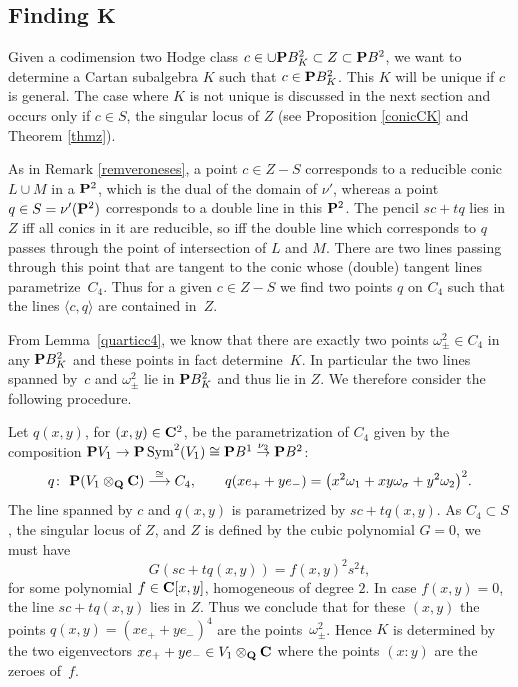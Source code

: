 \documentclass[pdftex]{sigma}
\numberwithin{equation}{section}
\begin{document}
\subsection[Finding K]{Finding $\boldsymbol{K}$} \label{findB2p}

Given a codimension two Hodge class $c\in \cup {\bf P} B^2_K\subset Z\subset {\bf P} B^2$,
we want to determine a Cartan subalgebra $K$ such that $c\in {\bf P} B^2_K$. This $K$ will be
unique if $c$ is general. The case where $K$ is not unique is discussed in the next section
and occurs only if $c\in S$, the singular locus of $Z$ (see Proposition \ref{conicCK} and
Theorem \ref{thmz}).

As in Remark \ref{remveroneses},
a point $c\in Z-S$ corresponds to a reducible conic $L\cup M$ in a ${\bf P}^2$, which is the dual of the
domain of $\nu'$,
whereas a point $q\in S=\nu'({\bf P}^2)$ corresponds to a double line in this ${\bf P}^2$.
The pencil $sc+tq$ lies in $Z$ iff all conics in it are reducible,
so iff the double line which corresponds to $q$ passes through the point of intersection of $L$ and $M$.
There are two lines passing through this point that are tangent to the conic whose (double) tangent lines
parametrize~$C_4$. Thus for a given $c\in Z-S$ we find two points $q$ on $C_4$ such that
the lines $\langle c,q\rangle $ are contained in~$Z$.

From Lemma~\ref{quarticc4}, we know that there are exactly two points
$\omega^2_\pm\in C_4$ in any ${\bf P} B^2_K$ and these points in fact determine~$K$.
In particular the two lines spanned by~$c$ and $\omega^2_\pm$
lie in ${\bf P} B^2_K$ and thus lie in $Z$.
We therefore consider the following procedure.

Let $q(x,y)$, for $(x,y)\in{\bf C}^2$, be the parametrization of $C_4$ given by the composition
${\bf P} V_1\rightarrow {\bf P} \operatorname{Sym}^2(V_1)\cong {\bf P} B^1\stackrel{\nu_2}{\rightarrow} {\bf P} B^2$:
\[
q\colon \ {\bf P} (V_1\otimes_{\bf Q}{\bf C}) \stackrel{\cong}{\longrightarrow} C_4,\qquad q(xe_++ye_-)=
\big(x^2\omega_1+xy\omega_\sigma+y^2\omega_2\big)^2.
\]
The line spanned by $c$ and $q(x,y)$ is parametrized by $sc+tq(x,y)$.
As $C_4\subset S$, the singular locus of $Z$, and $Z$ is defined by the cubic polynomial $G=0$,
we must have
\[
G(sc+tq(x,y))=f(x,y)^2s^2t,
\]
for some polynomial $f\in{\bf C}[x,y]$, homogeneous of degree $2$.
In case $f(x,y)=0$, the line $sc+tq(x,y)$ lies in $Z$.
Thus we conclude that for these $(x,y)$ the points
$q(x,y)=(xe_++ye_-)^4$ are the points~$\omega_\pm^2$. Hence $K$ is determined by the
two eigenvectors
$xe_++ye_-\in V_1\otimes_{\bf Q}{\bf C}$ where the points $(x:y)$ are the zeroes of~$f$.
\end{document}
